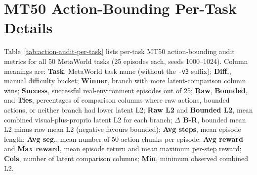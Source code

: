 \appendix
\chapter{MT50 Action-Bounding Per-Task Details}
\label{app:action-audit-per-task}

Table~\ref{tab:action-audit-per-task} lists per-task MT50 action-bounding audit metrics for all 50 MetaWorld tasks (25 episodes each, seeds 1000--1024). Column meanings are: \textbf{Task}, MetaWorld task name (without the \texttt{-v3} suffix); \textbf{Diff.}, manual difficulty bucket; \textbf{Winner}, branch with more latent-comparison column wins; \textbf{Success}, successful real-environment episodes out of 25; \textbf{Raw}, \textbf{Bounded}, and \textbf{Ties}, percentages of comparison columns where raw actions, bounded actions, or neither branch had lower latent L2; \textbf{Raw L2} and \textbf{Bounded L2}, mean combined visual-plus-proprio latent L2 for each branch; \textbf{$\Delta$ B-R}, bounded mean L2 minus raw mean L2 (negative favours bounded); \textbf{Avg steps}, mean episode length; \textbf{Avg seg.}, mean number of 50-action chunks per episode; \textbf{Avg reward} and \textbf{Max reward}, mean episode return and mean maximum per-step reward; \textbf{Cols}, number of latent comparison columns; \textbf{Min}, minimum observed combined L2.

